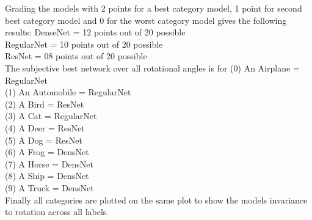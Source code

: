 Grading the models with 2 points for a best category model, 1 point for second best category model and 0 for the worst category model gives the following results:
DenseNet   = 12 points out of 20 possible\\
RegularNet = 10 points out of 20 possible\\
ResNet     = 08 points out of 20 possible\\

The subjective best network over all rotational angles is for
(0) An Airplane   = RegularNet\\
(1) An Automobile = RegularNet\\
(2) A Bird        = ResNet\\ 
(3) A Cat         = RegularNet\\
(4) A Deer        = ResNet\\
(5) A Dog         = ResNet\\
(6) A Frog        = DensNet\\
(7) A Horse       = DensNet\\
(8) A Ship        = DensNet\\
(9) A Truck       = DensNet\\

Finally all categories are plotted on the same plot to show the models invariance to rotation across all labels.
